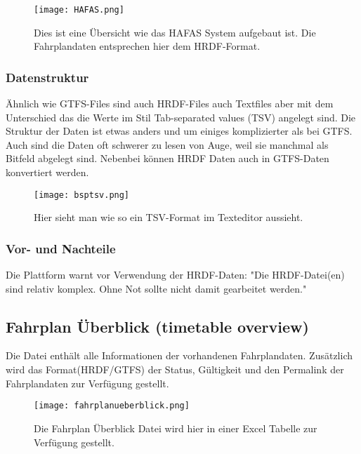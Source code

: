 \begin{figure}[]
	\centering
	\texttt{[image: HAFAS.png]}
	\caption{Dies ist eine Übersicht wie das HAFAS System aufgebaut ist. Die Fahrplandaten entsprechen hier dem HRDF-Format. \cite{haconUebersicht}}
	\label{fig:hafas-uebersicht}
\end{figure}



\subsubsection{Datenstruktur}
\label{sec:hrdf-datenstrukur}
Ähnlich wie GTFS-Files sind auch HRDF-Files auch Textfiles aber mit dem Unterschied das die Werte im Stil Tab-separated values (TSV) angelegt sind. Die Struktur der Daten ist etwas anders und um einiges komplizierter als bei GTFS. Auch sind die Daten oft schwerer zu lesen von Auge, weil sie manchmal als Bitfeld abgelegt sind. Nebenbei können HRDF Daten auch in GTFS-Daten konvertiert werden.\cite{hrdfintogtfs}
\begin{figure}[]
	\centering
	\texttt{[image: bsptsv.png]}
	\caption{Hier sieht man wie so ein TSV-Format im Texteditor aussieht.}
	\label{fig:hrdf-dateiformat}
\end{figure}


\subsubsection{Vor- und Nachteile}	
\label{sec:hrdf-vornachteile}
Die Plattform warnt vor Verwendung der HRDF-Daten: "Die HRDF-Datei(en) sind relativ komplex. Ohne Not sollte nicht damit gearbeitet werden."\cite{opentransporthrdf}

\subsection{Fahrplan Überblick (timetable overview)}
\label{sec:Fahrplan Ueberblick}
Die Datei enthält alle Informationen der vorhandenen Fahrplandaten. Zusätzlich wird das Format(HRDF/GTFS) der Status, Gültigkeit und den Permalink der Fahrplandaten zur Verfügung gestellt.

\begin{figure}[]
	\centering
	\texttt{[image: fahrplanueberblick.png]}
	\caption{Die Fahrplan Überblick Datei wird hier in einer Excel Tabelle zur Verfügung gestellt.}
	\label{fig:Fahrplan Ueberblick dateiformat}
\end{figure}

